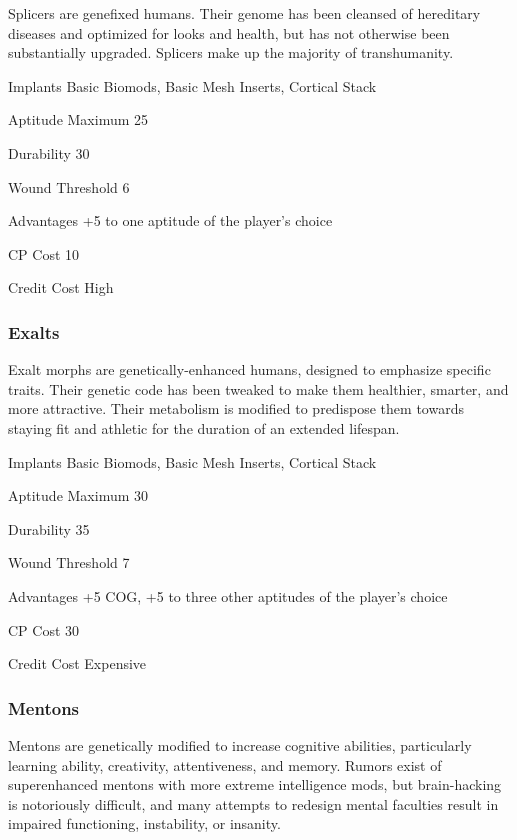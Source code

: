 Splicers are genefixed humans. Their genome has been cleansed of hereditary diseases and optimized for looks and health, but has not otherwise been substantially upgraded. Splicers make up the majority of transhumanity. 

\begin{description*} \item[Implants] Basic Biomods, Basic Mesh Inserts, Cortical Stack \item[Aptitude Maximum] 25 \item[Durability] 30 \item[Wound Threshold] 6 \item[Advantages] +5 to one aptitude of the player’s choice \item[CP Cost] 10 \item[Credit Cost] High \end{description*} 

\subsubsection{Exalts} \label{sec:starting-exalts} 

Exalt morphs are genetically-enhanced humans, designed to emphasize specific traits. Their genetic code has been tweaked to make them healthier, smarter, and more attractive. Their metabolism is modified to predispose them towards staying fit and athletic for the duration of an extended lifespan. 

\begin{description*} \item[Implants] Basic Biomods, Basic Mesh Inserts, Cortical Stack \item[Aptitude Maximum] 30 \item[Durability] 35 \item[Wound Threshold] 7 \item[Advantages] +5 COG, +5 to three other aptitudes of the player’s choice \item[CP Cost] 30 \item[Credit Cost] Expensive \end{description*} 

\subsubsection{Mentons} \label{sec:starting-mentons} 

Mentons are genetically modified to increase cognitive abilities, particularly learning ability, creativity, attentiveness, and memory. Rumors exist of superenhanced mentons with more extreme intelligence mods, but brain-hacking is notoriously difficult, and many attempts to redesign mental faculties result in impaired functioning, instability, or insanity. 

